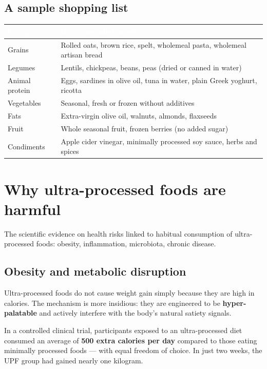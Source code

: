 \documentclass[a5paper,12pt,oneside,openany]{book}
\newcommand{\boxinfo}[2]{%
  \begin{tcolorbox}[boxbase,
    colback=infoBlue!8!white, colframe=infoBlue, title={#1}]
  #2\end{tcolorbox}}
\begin{document}
\section{A sample shopping list}

{\small
\begin{tabularx}{\textwidth}{|L|L|}
\hline
{}\textcolor{white}{\textbf{Category}}
  & \textcolor{white}{\textbf{Recommended products}} \\
\hline
Grains & Rolled oats, brown rice, spelt, wholemeal pasta, wholemeal artisan bread \\
\hline
Legumes & Lentils, chickpeas, beans, peas (dried or canned in water) \\
\hline
Animal protein & Eggs, sardines in olive oil, tuna in water, plain Greek yoghurt, ricotta \\
\hline
Vegetables & Seasonal, fresh or frozen without additives \\
\hline
Fats & Extra-virgin olive oil, walnuts, almonds, flaxseeds \\
\hline
Fruit & Whole seasonal fruit, frozen berries (no added sugar) \\
\hline
Condiments & Apple cider vinegar, minimally processed soy sauce, herbs and spices \\
\hline
\end{tabularx}
}

\chapter{Why ultra-processed foods are harmful}

The scientific evidence on health risks linked to habitual consumption of
ultra-processed foods: obesity, inflammation, microbiota, chronic disease.

\section{Obesity and metabolic disruption}

Ultra-processed foods do not cause weight gain simply because they are
high in calories. The mechanism is more insidious: they are engineered to
be \textbf{hyper-palatable} and actively interfere with the body's natural
satiety signals.

\boxinfo{Kevin Hall's study (NIH, 2019)}{In a controlled clinical trial,
participants exposed to an ultra-processed diet consumed an average of
\textbf{500 extra calories per day} compared to those eating minimally
processed foods --- with equal freedom of choice. In just two weeks,
the UPF group had gained nearly one kilogram.}
\end{document}
